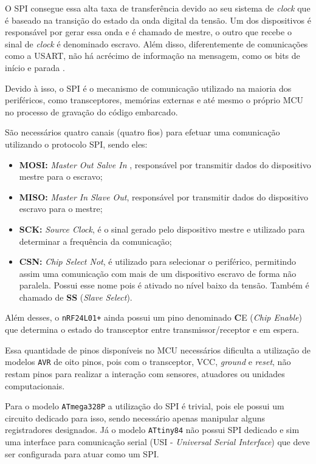 O SPI consegue essa alta taxa de transferência devido ao seu sistema de \textit{clock} que é baseado na
transição do estado da onda digital da tensão. Um dos dispositivos é responsável por gerar essa onda e é
chamado de mestre, o outro que recebe o sinal de \textit{clock} é denominado escravo. Além disso,
diferentemente de comunicações como a USART, não há acrécimo de informação na mensagem, como os bits de início
e parada \cite{williams2014}.

Devido à isso, o SPI é o mecanismo de comunicação utilizado na maioria dos periféricos, como transceptores,
memórias externas e até mesmo o próprio MCU no processo de gravação do código embarcado.

São necessários quatro canais (quatro fios) para efetuar uma comunicação utilizando o protocolo SPI, sendo
eles:

\begin{itemize}
	\item \textbf{MOSI:} \textit{Master Out Salve In} , responsável por transmitir dados do dispositivo
		mestre para o escravo;
	\item \textbf{MISO:} \textit{Master In Slave Out}, responsável por transmitir dados do dispositivo
		escravo para o mestre;
	\item \textbf{SCK:} \textit{Source Clock}, é o sinal gerado pelo dispositivo mestre e
		utilizado para determinar a frequência da comunicação;
	\item \textbf{CSN:} \textit{Chip Select Not}, é utilizado para selecionar o periférico, permitindo
		assim uma comunicação com mais de um dispositivo escravo de forma não paralela. Possui esse
		nome pois é ativado no nível baixo da tensão. Também é chamado de \textbf{SS} (\textit{Slave Select}).
\end{itemize}

Além desses, o \texttt{nRF24L01+} ainda possui um pino denominado \textbf{C}E (\textit{Chip Enable}) que
determina o estado do transceptor entre transmissor/receptor e em espera.

Essa quantidade de pinos disponíveis no MCU necessários dificulta a utilização de modelos \texttt{AVR} de oito
pinos, pois com o transceptor, VCC, \textit{ground} e \textit{reset}, não restam pinos para realizar a
interação com sensores, atuadores ou unidades computacionais.

Para o modelo \texttt{ATmega328P} a utilização do SPI é trivial, pois ele possui um circuito dedicado para
isso, sendo necessário apenas manipular alguns registradores designados. Já o modelo \texttt{ATtiny84} não
possui SPI dedicado e sim uma interface para comunicação serial (USI - \textit{Universal Serial Interface})
que deve ser configurada para atuar como um SPI.

